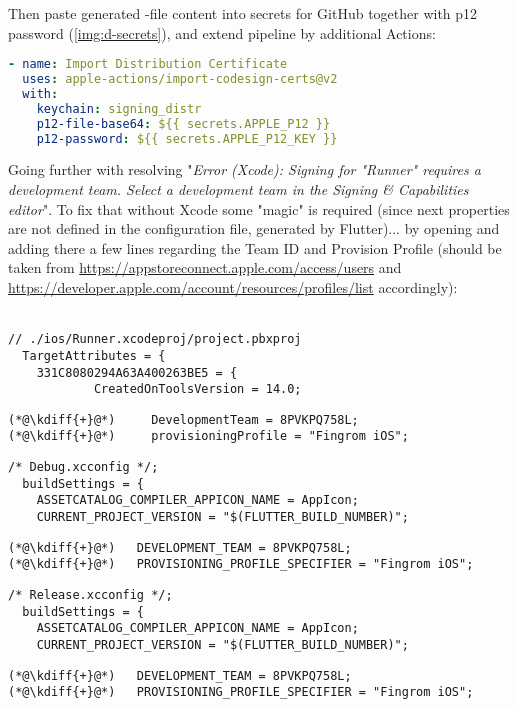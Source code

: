 Then paste generated -file content into secrets for GitHub together with p12 password (\cref{img:d-secrets}), 
and extend pipeline by additional Actions:

\begin{lstlisting}[language=yaml]
- name: Import Distribution Certificate
  uses: apple-actions/import-codesign-certs@v2
  with: 
    keychain: signing_distr
    p12-file-base64: ${{ secrets.APPLE_P12 }}
    p12-password: ${{ secrets.APPLE_P12_KEY }}
\end{lstlisting}


Going further with resolving "\emph{Error (Xcode): Signing for "Runner" requires a development team. Select a 
development team in the Signing \& Capabilities editor}". To fix that without Xcode some "magic" is required (since 
next properties are not defined in the configuration file, generated by Flutter)... by opening 
 and adding there a few lines regarding the Team ID and Provision Profile 
(should be taken from \href{https://appstoreconnect.apple.com/access/users}{https://appstoreconnect.apple.com/access/users}
and \href{https://developer.apple.com/account/resources/profiles/list}{https://developer.apple.com/account/resources/profiles/list}
accordingly):\\
\\

{
\xpretocmd{\lstlisting}{\vspace{-14pt}}{}{}
\begin{lstlisting}[firstnumber=172]
// ./ios/Runner.xcodeproj/project.pbxproj
  TargetAttributes = {
    331C8080294A63A400263BE5 = {
			CreatedOnToolsVersion = 14.0;
\end{lstlisting}
\begin{lstlisting}[firstnumber=176, backgroundcolor=\color{backgreen}]
(*@\kdiff{+}@*)     DevelopmentTeam = 8PVKPQ758L;
(*@\kdiff{+}@*)     provisioningProfile = "Fingrom iOS";
\end{lstlisting}
\begin{lstlisting}[firstnumber=540]
            /* Debug.xcconfig */;
  buildSettings = {
    ASSETCATALOG_COMPILER_APPICON_NAME = AppIcon;
    CURRENT_PROJECT_VERSION = "$(FLUTTER_BUILD_NUMBER)";
\end{lstlisting}
\begin{lstlisting}[firstnumber=543, backgroundcolor=\color{backgreen}]
(*@\kdiff{+}@*)   DEVELOPMENT_TEAM = 8PVKPQ758L;
(*@\kdiff{+}@*)   PROVISIONING_PROFILE_SPECIFIER = "Fingrom iOS";
\end{lstlisting}
\begin{lstlisting}[firstnumber=564]
            /* Release.xcconfig */;
  buildSettings = {
    ASSETCATALOG_COMPILER_APPICON_NAME = AppIcon;
    CURRENT_PROJECT_VERSION = "$(FLUTTER_BUILD_NUMBER)";
\end{lstlisting}
\begin{lstlisting}[firstnumber=567, backgroundcolor=\color{backgreen}]
(*@\kdiff{+}@*)   DEVELOPMENT_TEAM = 8PVKPQ758L;
(*@\kdiff{+}@*)   PROVISIONING_PROFILE_SPECIFIER = "Fingrom iOS";
\end{lstlisting}
}

